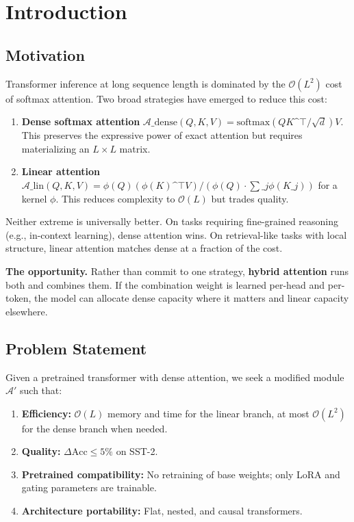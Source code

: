 
\section{Introduction}

\subsection{Motivation}

Transformer inference at long sequence length is dominated by the 
$\mathcal{O}(L^2)$ cost of softmax attention. Two broad strategies have 
emerged to reduce this cost:

\begin{enumerate}
\item \textbf{Dense softmax attention} $\mathcal{A}\_\text{dense}(Q, K, V) =
  \text{softmax}(QK\^{}\top / \sqrt{d}) V$. This preserves the expressive power
  of exact attention but requires materializing an $L \times L$ matrix.

\item \textbf{Linear attention} $\mathcal{A}\_\text{lin}(Q, K, V) =
  \phi(Q) (\phi(K)\^{}\top V) / (\phi(Q) \cdot \sum\_j \phi(K\_j))$ for a kernel
  $\phi$. This reduces complexity to $\mathcal{O}(L)$ but trades quality.

\end{enumerate}
Neither extreme is universally better. On tasks requiring fine-grained 
reasoning (e.g., in-context learning), dense attention wins. On retrieval-like 
tasks with local structure, linear attention matches dense at a fraction of 
the cost.

\textbf{The opportunity.} Rather than commit to one strategy, \textbf{hybrid attention} 
runs both and combines them. If the combination weight is learned per-head 
and per-token, the model can allocate dense capacity where it matters and 
linear capacity elsewhere.

\subsection{Problem Statement}

Given a pretrained transformer with dense attention, we seek a modified 
module $\mathcal{A}'$ such that:

\begin{enumerate}
\item \textbf{Efficiency:} $\mathcal{O}(L)$ memory and time for the linear branch,
  at most $\mathcal{O}(L^2)$ for the dense branch when needed.
\item \textbf{Quality:} $\Delta\text{Acc} \leq 5\%$ on SST-2.
\item \textbf{Pretrained compatibility:} No retraining of base weights; only LoRA
  and gating parameters are trainable.
\item \textbf{Architecture portability:} Flat, nested, and causal transformers.

\end{enumerate}
